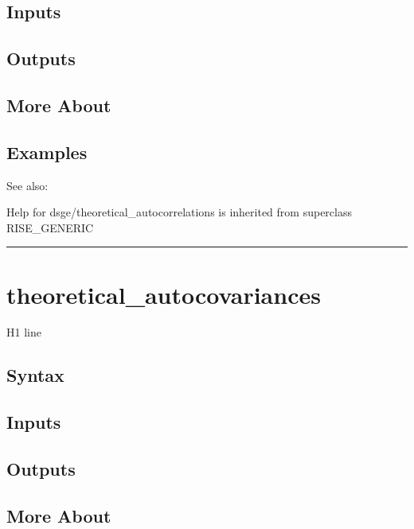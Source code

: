 \documentclass[letterpaper,10pt,english]{sphinxmanual}
\begin{document}
\subsection{Inputs}
\label{classes/models/@dsge/dsge:id208}

\subsection{Outputs}
\label{classes/models/@dsge/dsge:id209}

\subsection{More About}
\label{classes/models/@dsge/dsge:id210}

\subsection{Examples}
\label{classes/models/@dsge/dsge:id211}
See also:

Help for dsge/theoretical\_autocorrelations is inherited from superclass RISE\_GENERIC


\bigskip\hrule{}\bigskip



\section{theoretical\_autocovariances}
\label{classes/models/@dsge/dsge:theoretical-autocovariances}\label{classes/models/@dsge/dsge:id212}
H1 line


\subsection{Syntax}
\label{classes/models/@dsge/dsge:id213}

\subsection{Inputs}
\label{classes/models/@dsge/dsge:id214}

\subsection{Outputs}
\label{classes/models/@dsge/dsge:id215}

\subsection{More About}
\label{classes/models/@dsge/dsge:id216}
\end{document}
